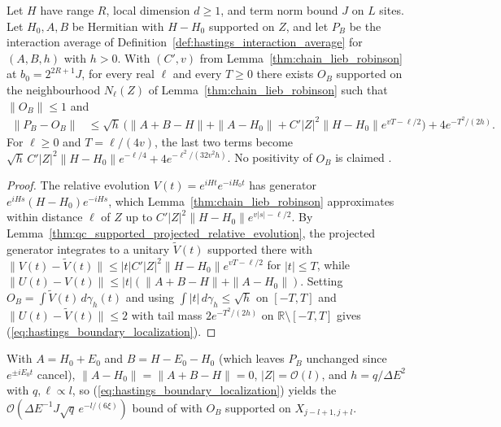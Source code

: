 \begin{lemma}
    \label{thm:hastings_boundary_localization}
    \leanok
    Let $H$ have range $R$, local dimension $d\ge1$, and term norm bound $J$ on
    $L$ sites. Let $H_0,A,B$ be Hermitian with $H-H_0$ supported on $Z$, and let
    $P_B$ be the interaction average of
    Definition~\ref{def:hastings_interaction_average} for $(A,B,h)$ with $h>0$.
    With $(C',v)$ from Lemma~\ref{thm:chain_lieb_robinson} at
    $b_0=2^{2R+1}J$, for every real $\ell$ and every $T\ge0$ there exists $O_B$
    supported on the neighbourhood $N_\ell(Z)$ of Lemma~\ref{thm:chain_lieb_robinson}
    such that $\|O_B\|\le1$ and
    \begin{align}
        \|P_B-O_B\| & \le\sqrt h\,\bigl(\|A+B-H\|+\|A-H_0\|
        +C'|Z|^2\|H-H_0\|e^{vT-\ell/2}\bigr)+4e^{-T^2/(2h)}.
        \label{eq:hastings_boundary_localization}
    \end{align}
    For $\ell\ge0$ and $T=\ell/(4v)$, the last two terms become
    $\sqrt h\,C'|Z|^2\|H-H_0\|e^{-\ell/4}+4e^{-\ell^2/(32v^2h)}$.
    No positivity of $O_B$ is claimed \cite[note added]{Hastings2007AreaLaw}.
\end{lemma}
\begin{proof}\leanok
    The relative evolution $V(t)=e^{iHt}e^{-iH_0t}$ has generator
    $e^{iHs}(H-H_0)e^{-iHs}$, which Lemma~\ref{thm:chain_lieb_robinson}
    approximates within distance $\ell$ of $Z$ up to
    $C'|Z|^2\|H-H_0\|e^{v|s|-\ell/2}$. By
    Lemma~\ref{thm:qc_supported_projected_relative_evolution}, the projected
    generator integrates to a unitary $\widetilde V(t)$ supported there with
    $\|V(t)-\widetilde V(t)\|\le|t|C'|Z|^2\|H-H_0\|e^{vT-\ell/2}$ for
    $|t|\le T$, while $\|U(t)-V(t)\|\le|t|(\|A+B-H\|+\|A-H_0\|)$. Setting
    $O_B=\int\widetilde V(t)\,d\gamma_h(t)$ and using
    $\int|t|\,d\gamma_h\le\sqrt h$ on $[-T,T]$ and $\|U(t)-\widetilde V(t)\|\le2$
    with tail mass $2e^{-T^2/(2h)}$ on $\mathbb R\setminus[-T,T]$ gives
    (\ref{eq:hastings_boundary_localization}).
\end{proof}

With $A=H_0+E_0$ and $B=H-E_0-H_0$ (which leaves $P_B$ unchanged since
$e^{\pm iE_0t}$ cancel), $\|A-H_0\|=\|A+B-H\|=0$, $|Z|=\mathcal O(l)$, and
$h=q/\Delta E^2$ with $q,\ell\propto l$, so
(\ref{eq:hastings_boundary_localization}) yields the
$\mathcal O(\Delta E^{-1}J\sqrt q\,e^{-l/(6\xi)})$ bound of
\cite[lines 896--905]{Hastings2007AreaLaw} with $O_B$ supported on
$X_{j-l+1,j+l}$.

